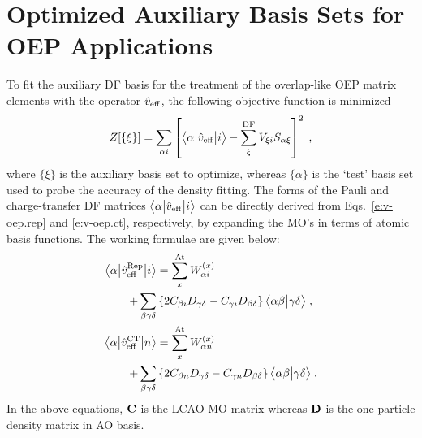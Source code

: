 \section{Optimized Auxiliary Basis Sets for OEP Applications\label{a:auxiliary-basis}}

To fit the auxiliary DF basis for the treatment of the overlap\hyp{}like
OEP matrix elements with the operator $\hat{v}_{\rm eff}$, 
the following objective function is minimized
%
\begin{equation} \label{e:a1-obj}
 Z[\{\xi\}] = \sum_{\alpha i} \left[ 
     \bigl\langle {\alpha} \bigl\lvert {\hat{v}_{\rm eff}} \bigl\lvert {i} \bigr\rangle - 
     \sum_{\xi}^{\rm DF} V_{\xi i} S_{\alpha \xi} 
    \right]^2 \;,
\end{equation}
%
where $\{\xi\}$ is the auxiliary basis set to optimize, whereas $\{\alpha\}$
is the `test' basis set used to probe the accuracy of the density fitting.
The forms of the Pauli and charge\hyp{}transfer DF matrices $\bigl\langle {\alpha} \bigl\lvert {\hat{v}_{\rm eff}} \bigl\lvert {i} \bigr\rangle$
can be directly derived from Eqs.~\eqref{e:v-oep.rep} and \eqref{e:v-oep.ct}, respectively, 
by expanding the MO's in terms of atomic basis functions. The working formulae
are given below:
%
\begin{subequations} \label{e:a1-v.oep}
 \begin{align}
   \bigl\langle {\alpha} \bigl\lvert {\hat{v}_{\rm eff}^{\rm Rep}} \bigl\lvert {i} \bigr\rangle
     &= \sum_{x}^{\rm At} W_{\alpha i}^{(x)} \nonumber   \\ 
        + \sum_{\beta\gamma\delta} &
           \left\{ 
             2 C_{\beta i} D_{\gamma\delta} - C_{\gamma i} D_{\beta \delta}
           \right\}
           \bigl\langle {\alpha\beta} \bigl\lvert {\gamma\delta} \bigr\rangle \;,\\
   \bigl\langle {\alpha} \bigl\lvert {\hat{v}_{\rm eff}^{\rm CT}} \bigl\lvert {n} \bigr\rangle 
     &= \sum_{x}^{\rm At} W_{\alpha n}^{(x)} \nonumber   \\
       + \sum_{\beta\gamma\delta} &
           \left\{
             2 C_{\beta n} D_{\gamma\delta} - C_{\gamma n} D_{\beta \delta}
           \right\}
           \bigl\langle {\alpha\beta} \bigl\lvert {\gamma\delta} \bigr\rangle
    \;.
 \end{align}
\end{subequations}
%
In the above equations, ${\bf C}$ is the LCAO\hyp{}MO matrix whereas ${\bf D}$
is the one\hyp{}particle density matrix in AO basis.

